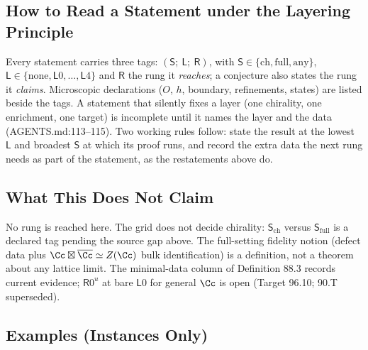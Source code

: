 \subsection{How to Read a Statement under the Layering Principle}

Every statement carries three tags: \((\mathsf S;\ \mathsf L;\ \mathsf R)\), with \(\mathsf S\in\{\text{ch},\text{full},
\text{any}\}\), \(\mathsf L\in\{\text{none},\mathsf L0,\dots,\mathsf L4\}\) and \(\mathsf R\) the rung it \emph{reaches}; a
conjecture also states the rung it \emph{claims}.  Microscopic declarations (\(O\), \(h\), boundary, refinements, states)
are listed beside the tags.  A statement that silently fixes a layer (one chirality, one enrichment, one target) is
incomplete until it names the layer and the data (AGENTS.md:113--115).  Two working rules follow:
state the result at the lowest \(\mathsf L\) and broadest \(\mathsf S\) at which its proof runs, and record the extra
data the next rung needs as part of the statement, as the restatements above do.

\subsection{What This Does Not Claim}

No rung is reached here.  The grid does not decide chirality: \(\mathsf S_{\mathrm{ch}}\) versus \(\mathsf S_{\mathrm{full}}\) is a
declared tag pending the source gap above.  The full-setting fidelity notion (defect data plus \(\Cc\boxtimes\overline{\Cc}
\simeq Z(\Cc)\) bulk identification) is a definition, not a theorem about any lattice limit.  The minimal-data column of
Definition 88.3 records current evidence; \(\mathsf R0^u\) at bare \(\mathsf L0\) for general \(\Cc\) is open (Target 96.10; 90.T superseded).

\subsection{Examples (Instances Only)}

